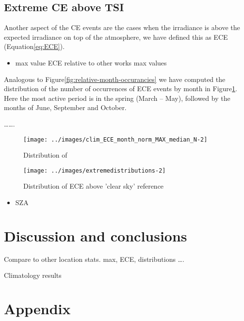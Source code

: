 \documentclass[preprint, 3p,
authoryear]{elsarticle} %
\providecommand{\tightlist}{%
  \setlength{\itemsep}{0pt}\setlength{\parskip}{0pt}}
\begin{document}
\hypertarget{extreme-ce-above-tsi}{%
\subsection{Extreme CE above TSI}\label{extreme-ce-above-tsi}}

Another aspect of the CE events are the cases when the irradiance is
above the expected irradiance on top of the atmosphere, we have defined
this as ECE (Equation\nobreakspace{}\ref{eq:ECE}).

\begin{itemize}
\tightlist
\item
  max value ECE relative to other works max values
\end{itemize}

Analogous to Figure\nobreakspace{}\ref{fig:relative-month-occurancies}
we have computed the distribution of the number of occurrences of ECE
events by month in
Figure\nobreakspace{}\ref{fig:relative-month-occurancies-ECE}. Here the
most active period is in the spring (March -- May), followed by the
months of June, September and October.

\ldots\ldots.

\begin{figure}

{\centering \texttt{[image: ../images/clim\_ECE\_month\_norm\_MAX\_median\_N-2]} 

}

\caption{Distribution of }\label{fig:relative-month-occurancies-ECE}
\end{figure}

\begin{figure}

{\centering \texttt{[image: ../images/extremedistributions-2]} 

}

\caption{Distribution of ECE above 'clear sky' reference}\label{fig:unnamed-chunk-4}
\end{figure}

\begin{itemize}
\tightlist
\item
  SZA
\end{itemize}

\hypertarget{discussion-and-conclusions}{%
\section{Discussion and conclusions}\label{discussion-and-conclusions}}

Compare to other location stats. max, ECE, distributions \ldots.

Climatology results

\hypertarget{appendix}{%
\section*{Appendix}\label{appendix}}


\end{document}
